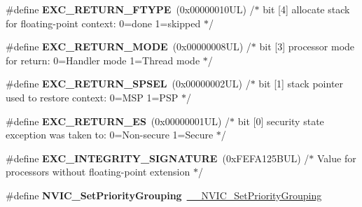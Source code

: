 \begin{DoxyCompactItemize}
\#define {\bfseries E\+X\+C\+\_\+\+R\+E\+T\+U\+R\+N\+\_\+\+F\+T\+Y\+PE}~(0x00000010\+U\+L)     /$\ast$ bit \mbox{[}4\mbox{]} allocate stack for floating-\/point context\+: 0=done 1=skipped  $\ast$/
\item 
\mbox{\label{group___c_m_s_i_s___core___n_v_i_c_functions_gabb65f847769a7807395b2739cc9702d0}} 
\#define {\bfseries E\+X\+C\+\_\+\+R\+E\+T\+U\+R\+N\+\_\+\+M\+O\+DE}~(0x00000008\+U\+L)     /$\ast$ bit \mbox{[}3\mbox{]} processor mode for return\+: 0=\+Handler mode 1=\+Thread mode      $\ast$/
\item 
\mbox{\label{group___c_m_s_i_s___core___n_v_i_c_functions_ga686922b26c29eac540f53a6213627466}} 
\#define {\bfseries E\+X\+C\+\_\+\+R\+E\+T\+U\+R\+N\+\_\+\+S\+P\+S\+EL}~(0x00000002\+U\+L)     /$\ast$ bit \mbox{[}1\mbox{]} stack pointer used to restore context\+: 0=\+M\+S\+P 1=\+P\+S\+P           $\ast$/
\item 
\mbox{\label{group___c_m_s_i_s___core___n_v_i_c_functions_gac939dbf69d3063c76a28516a4ae84db7}} 
\#define {\bfseries E\+X\+C\+\_\+\+R\+E\+T\+U\+R\+N\+\_\+\+ES}~(0x00000001\+U\+L)     /$\ast$ bit \mbox{[}0\mbox{]} security state exception was taken to\+: 0=\+Non-\/secure 1=\+Secure $\ast$/
\item 
\mbox{\label{group___c_m_s_i_s___core___n_v_i_c_functions_ga7d1b21b2d863ccd9e23a3295b3173155}} 
\#define {\bfseries E\+X\+C\+\_\+\+I\+N\+T\+E\+G\+R\+I\+T\+Y\+\_\+\+S\+I\+G\+N\+A\+T\+U\+RE}~(0x\+F\+E\+F\+A125\+B\+U\+L)     /$\ast$ Value for processors without floating-\/point extension                $\ast$/
\item 
\mbox{\label{group___c_m_s_i_s___core___n_v_i_c_functions_ga0e798d5aec68cdd8263db86a76df788f}} 
\#define {\bfseries N\+V\+I\+C\+\_\+\+Set\+Priority\+Grouping}~\hyperlink{group___c_m_s_i_s___core___n_v_i_c_functions_gafc94dcbaee03e4746ade1f5bb9aaa56d}{\+\_\+\+\_\+\+N\+V\+I\+C\+\_\+\+Set\+Priority\+Grouping}
\item 
\mbox{\label{group___c_m_s_i_s___core___n_v_i_c_functions_ga4eeb9214f2264fc23c34ad5de2d3fa11}} 

\end{DoxyCompactItemize}
